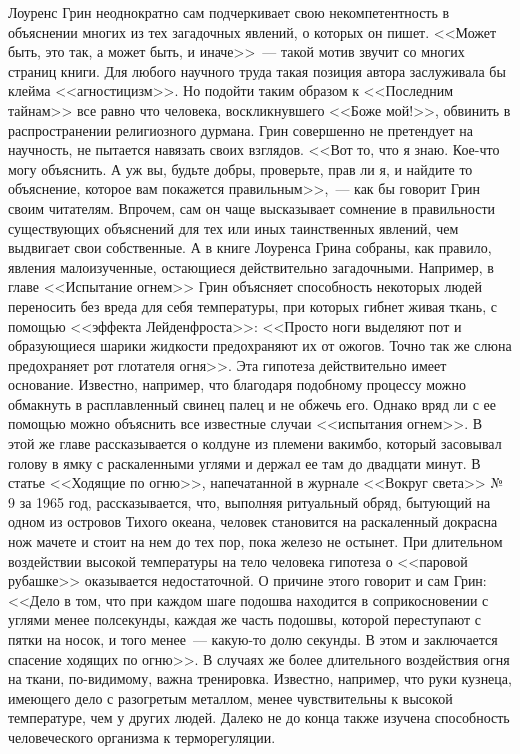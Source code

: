 \documentclass[12pt,a4paper,twoside,openany,svgnames]{memoir}
\begin{document}
Лоуренс Грин неоднократно сам подчеркивает свою некомпетентность в объяснении многих из тех загадочных явлений, о которых он пишет. <<Может быть, это так, а может быть, и иначе>>~--- такой мотив звучит со многих страниц книги. Для любого научного труда такая позиция автора заслуживала бы клейма <<агностицизм>>. Но подойти таким образом к <<Последним тайнам>> все равно что человека, воскликнувшего <<Боже мой!>>, обвинить в распространении религиозного дурмана. Грин совершенно не претендует на научность, не пытается навязать своих взглядов. <<Вот то, что я знаю. Кое-что могу объяснить. А уж вы, будьте добры, проверьте, прав ли я, и найдите то объяснение, которое вам покажется правильным>>,~--- как бы говорит Грин своим читателям. Впрочем, сам он чаще высказывает сомнение в правильности существующих объяснений для тех или иных таинственных явлений, чем выдвигает свои собственные. А в книге Лоуренса Грина собраны, как правило, явления малоизученные, остающиеся действительно загадочными. Например, в главе <<Испытание огнем>> Грин объясняет способность некоторых людей переносить без вреда для себя температуры, при которых гибнет живая ткань, с помощью <<эффекта Лейденфроста>>: <<Просто ноги выделяют пот и образующиеся шарики жидкости предохраняют их от ожогов. Точно так же слюна предохраняет рот глотателя огня>>. Эта гипотеза действительно имеет основание. Известно, например, что благодаря подобному процессу можно обмакнуть в расплавленный свинец палец и не обжечь его. Однако вряд ли с ее помощью можно объяснить все известные случаи <<испытания огнем>>. В этой же главе рассказывается о колдуне из племени вакимбо, который засовывал голову в ямку с раскаленными углями и держал ее там до двадцати минут. В статье <<Ходящие по огню>>, напечатанной в журнале <<Вокруг света>> № 9 за 1965 год, рассказывается, что, выполняя ритуальный обряд, бытующий на одном из островов Тихого океана, человек становится на раскаленный докрасна нож мачете и стоит на нем до тех пор, пока железо не остынет. При длительном воздействии высокой температуры на тело человека гипотеза о <<паровой рубашке>> оказывается недостаточной. О причине этого говорит и сам Грин: <<Дело в том, что при каждом шаге подошва находится в соприкосновении с углями менее полсекунды, каждая же часть подошвы, которой переступают с пятки на носок, и того менее~--- какую-то долю секунды. В этом и заключается спасение ходящих по огню>>. В случаях же более длительного воздействия огня на ткани, по-видимому, важна тренировка. Известно, например, что руки кузнеца, имеющего дело с разогретым металлом, менее чувствительны к высокой температуре, чем у других людей. Далеко не до конца также изучена способность человеческого организма к терморегуляции.
\end{document}
